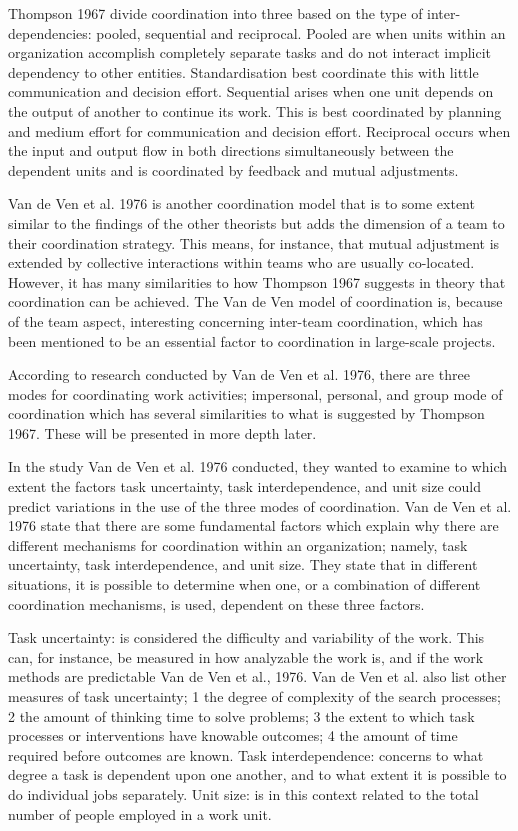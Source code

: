 Thompson 1967 divide coordination into three based on the type of inter-dependencies: pooled, sequential and reciprocal. Pooled are when units within an organization accomplish completely separate tasks and do not interact implicit dependency to other entities. Standardisation best coordinate this with little communication and decision effort. Sequential arises when one unit depends on the output of another to continue its work. This is best coordinated by planning and medium effort for communication and decision effort. Reciprocal occurs when the input and output flow in both directions simultaneously between the dependent units and is coordinated by feedback and mutual adjustments.

Van de Ven et al. 1976 is another coordination model that is to some extent similar to the findings of the other theorists but adds the dimension of a team to their coordination strategy. This means, for instance, that mutual adjustment is extended by collective interactions within teams who are usually co-located. However, it has many similarities to how Thompson 1967 suggests in theory that coordination can be achieved. The Van de Ven model of coordination is, because of the team aspect, interesting concerning inter-team coordination, which has been mentioned to be an essential factor to coordination in large-scale projects.

According to research conducted by Van de Ven et al. 1976, there are three modes for coordinating work activities; impersonal, personal, and group mode of coordination which has several similarities to what is suggested by Thompson 1967. These will be presented in more depth later.

In the study Van de Ven et al. 1976 conducted, they wanted to examine to which extent the factors task uncertainty, task interdependence, and unit size could predict variations in the use of the three modes of coordination.
Van de Ven et al. 1976 state that there are some fundamental factors which explain why there are different mechanisms for coordination within an organization; namely, task uncertainty, task interdependence, and unit size. They state that in different situations, it is possible to determine when one, or a combination of different coordination mechanisms, is used, dependent on these three factors.

Task uncertainty: is considered the difficulty and variability of the work. This can, for instance, be measured in how analyzable the work is, and if the work methods are predictable Van de Ven et al., 1976. Van de Ven et al. also list other measures of task uncertainty; 1 the degree of complexity of the search processes; 2 the amount of thinking time to solve problems; 3 the extent to which task processes or interventions have knowable outcomes; 4 the amount of time required before outcomes are known.
Task interdependence: concerns to what degree a task is dependent upon one another, and to what extent it is possible to do individual jobs separately.
Unit size: is in this context related to the total number of people employed in a work unit.

